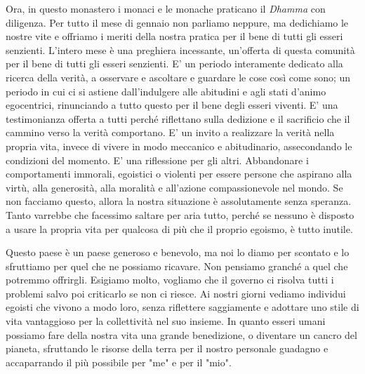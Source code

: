 Ora, in questo monastero i monaci e le monache praticano il \textit{Dhamma} con
diligenza. Per tutto il mese di gennaio non parliamo neppure, ma
dedichiamo le nostre vite e offriamo i meriti della nostra pratica per
il bene di tutti gli esseri senzienti. L'intero mese è una preghiera
incessante, un'offerta di questa comunità per il bene di tutti gli
esseri senzienti. E' un periodo interamente dedicato alla ricerca della
verità, a osservare e ascoltare e guardare le cose così come sono; un
periodo in cui ci si astiene dall'indulgere alle abitudini e agli stati
d'animo egocentrici, rinunciando a tutto questo per il bene degli esseri
viventi. E' una testimonianza offerta a tutti perché riflettano sulla
dedizione e il sacrificio che il cammino verso la verità comportano. E'
un invito a realizzare la verità nella propria vita, invece di vivere in
modo meccanico e abitudinario, assecondando le condizioni del momento.
E' una riflessione per gli altri. Abbandonare i comportamenti immorali,
egoistici o violenti per essere persone che aspirano alla virtù, alla
generosità, alla moralità e all'azione compassionevole nel mondo. Se non
facciamo questo, allora la nostra situazione è assolutamente senza
speranza. Tanto varrebbe che facessimo saltare per aria tutto, perché se
nessuno è disposto a usare la propria vita per qualcosa di più che il
proprio egoismo, è tutto inutile.

Questo paese è un paese generoso e benevolo, ma noi lo diamo per
scontato e lo sfruttiamo per quel che ne possiamo ricavare. Non pensiamo
granché a quel che potremmo offrirgli. Esigiamo molto, vogliamo che il
governo ci risolva tutti i problemi salvo poi criticarlo se non ci
riesce. Ai nostri giorni vediamo individui egoisti che vivono a modo
loro, senza riflettere saggiamente e adottare uno stile di vita
vantaggioso per la collettività nel suo insieme. In quanto esseri umani
possiamo fare della nostra vita una grande benedizione, o diventare un
cancro del pianeta, sfruttando le risorse della terra per il nostro
personale guadagno e accaparrando il più possibile per "me" e per il
"mio".


